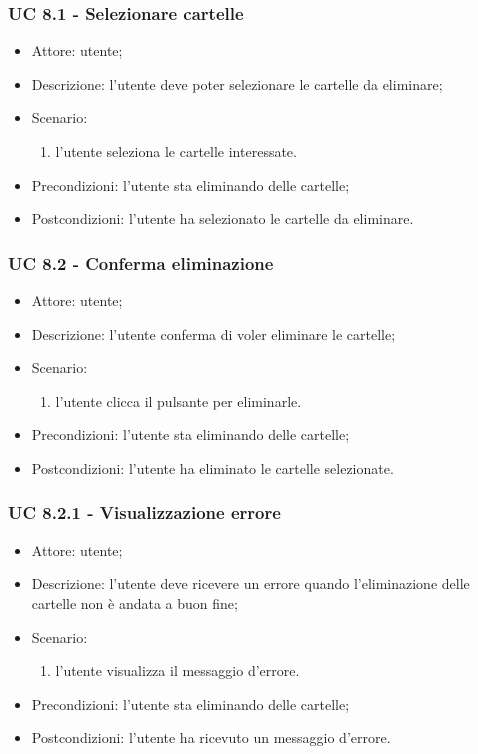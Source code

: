     \subsubsection{UC 8.1 - Selezionare cartelle}
    \begin{itemize}
        \item Attore: utente;
        \item Descrizione: l'utente deve poter selezionare le cartelle da eliminare;
        \item Scenario:
        \begin{enumerate}
        \item l'utente seleziona le cartelle interessate.
        \end{enumerate}
        \item Precondizioni: l'utente sta eliminando delle cartelle;
        \item Postcondizioni: l'utente ha selezionato le cartelle da eliminare.
    \end{itemize}

    \subsubsection{UC 8.2 - Conferma eliminazione}
    \begin{itemize}
        \item Attore: utente;
        \item Descrizione: l'utente conferma di voler eliminare le cartelle;
        \item Scenario:
        \begin{enumerate}
        \item l'utente clicca il pulsante per eliminarle.
        \end{enumerate}
        \item Precondizioni: l'utente sta eliminando delle cartelle;
        \item Postcondizioni: l'utente ha eliminato le cartelle selezionate.
    \end{itemize}

    \subsubsection{UC 8.2.1 - Visualizzazione errore }
    \begin{itemize}
        \item Attore: utente;
        \item Descrizione: l'utente deve ricevere un errore quando l'eliminazione delle cartelle non è andata a buon fine;
        \item Scenario:
        \begin{enumerate}
        \item l'utente visualizza il messaggio d'errore.
        \end{enumerate}   
        \item Precondizioni: l'utente sta eliminando delle cartelle;
        \item Postcondizioni: l'utente ha ricevuto un messaggio d'errore.
    \end{itemize}

